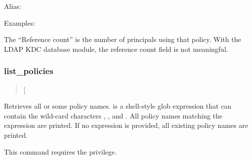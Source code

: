 \documentclass[letterpaper,10pt,english]{sphinxmanual}
\begin{document}
Alias: 

Examples:

%
\begin{sphinxVerbatim}[commandchars=\\\{\}]
  
 
     
   
   
      
     
  

   
                       
\end{sphinxVerbatim}

The “Reference count” is the number of principals using that policy.
With the LDAP KDC database module, the reference count field is not
meaningful.


\subsubsection{list\_policies}
\label{\detokenize{admin/admin_commands/kadmin_local:list-policies}}\label{\detokenize{admin/admin_commands/kadmin_local:id16}}\begin{quote}

 {[}\sphinxstyleemphasis{expression}{]}
\end{quote}

Retrieves all or some policy names.   is a shell-style
glob expression that can contain the wild-card characters ,
\sphinxcode{*}, and \sphinxcode{{[}{]}}.  All policy names matching the expression are
printed.  If no expression is provided, all existing policy names are
printed.

This command requires the  privilege.
\end{document}
